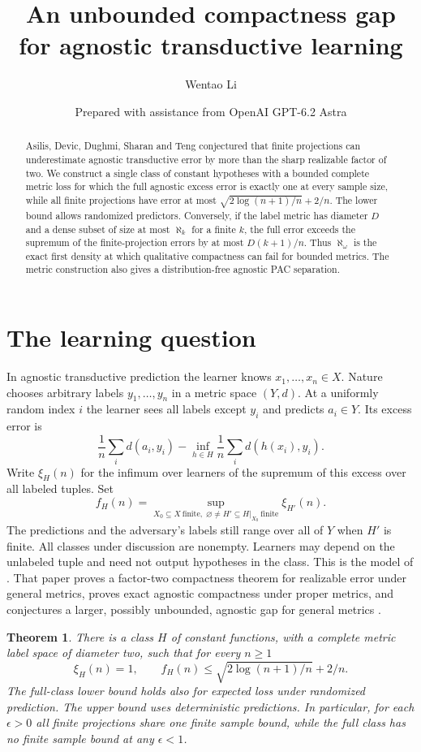 \documentclass[11pt]{article}
\title{An unbounded compactness gap for agnostic transductive learning}
\author{Wentao Li}
\date{\small Prepared with assistance from OpenAI GPT-6.2 Astra}
\newtheorem{theorem}{Theorem}
\newcommand{\err}{\xi}
\begin{document}
\maketitle
\begin{abstract}
Asilis, Devic, Dughmi, Sharan and Teng conjectured that finite projections can underestimate agnostic transductive error by more than the sharp realizable factor of two. We construct a single class of constant hypotheses with a bounded complete metric loss for which the full agnostic excess error is exactly one at every sample size, while all finite projections have error at most $\sqrt{2\log(n+1)/n}+2/n$. The lower bound allows randomized predictors. Conversely, if the label metric has diameter $D$ and a dense subset of size at most $\aleph_k$ for a finite $k$, the full error exceeds the supremum of the finite-projection errors by at most $D(k+1)/n$. Thus $\aleph_\omega$ is the exact first density at which qualitative compactness can fail for bounded metrics. The metric construction also gives a distribution-free agnostic PAC separation.
\end{abstract}

\section{The learning question}
In agnostic transductive prediction the learner knows $x_1,\ldots,x_n\in X$. Nature chooses arbitrary labels $y_1,\ldots,y_n$ in a metric space $(Y,d)$. At a uniformly random index $i$ the learner sees all labels except $y_i$ and predicts $a_i\in Y$. Its excess error is
\[
 \frac1n\sum_i d(a_i,y_i)-\inf_{h\in H}\frac1n\sum_i d(h(x_i),y_i).
\]
Write $\err_H(n)$ for the infimum over learners of the supremum of this excess over all labeled tuples. Set
\[
 f_H(n)=\sup_{X_0\subseteq X\ \mathrm{finite},\;
       \varnothing\ne H'\subseteq H|_{X_0}\ \mathrm{finite}} \err_{H'}(n).
\]
The predictions and the adversary's labels still range over all of $Y$ when $H'$ is finite. All classes under discussion are nonempty. Learners may depend on the unlabeled tuple and need not output hypotheses in the class. This is the model of \cite[Definitions 2.1--2.3 and 3.15]{compact}. That paper proves a factor-two compactness theorem for realizable error under general metrics, proves exact agnostic compactness under proper metrics, and conjectures a larger, possibly unbounded, agnostic gap for general metrics \cite[Sections 3.3 and 4]{compact}.

\begin{theorem}\label{main}
There is a class $H$ of constant functions, with a complete metric label space of diameter two, such that for every $n\ge1$
\[
 \err_H(n)=1,\qquad
 f_H(n)\le \sqrt{2\log(n+1)/n}+2/n .
\]
The full-class lower bound holds also for expected loss under randomized prediction. The upper bound uses deterministic predictions. In particular, for each $\epsilon>0$ all finite projections share one finite sample bound, while the full class has no finite sample bound at any $\epsilon<1$.
\end{theorem}
\end{document}
